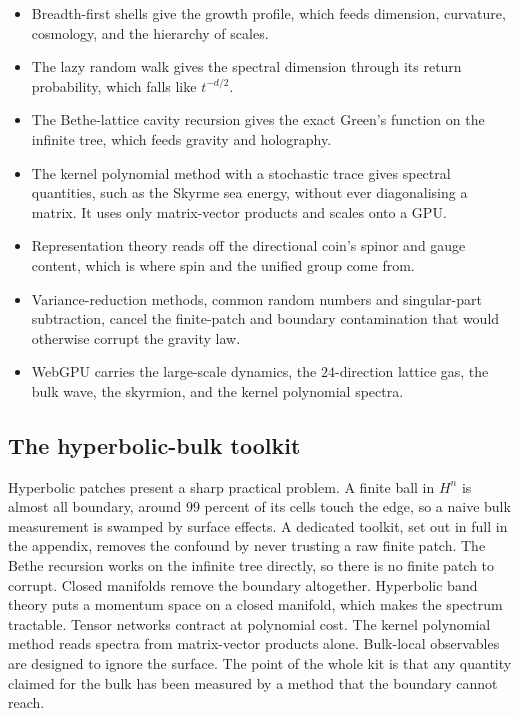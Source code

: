 \begin{itemize}
  \item Breadth-first shells give the growth profile, which feeds dimension, curvature, cosmology, and the
  hierarchy of scales.
  \item The lazy random walk gives the spectral dimension through its return probability, which falls like
  $t^{-d/2}$.
  \item The Bethe-lattice cavity recursion gives the exact Green's function on the infinite tree, which feeds
  gravity and holography.
  \item The kernel polynomial method with a stochastic trace gives spectral quantities, such as the Skyrme sea
  energy, without ever diagonalising a matrix. It uses only matrix-vector products and scales onto a GPU.
  \item Representation theory reads off the directional coin's spinor and gauge content, which is where spin and
  the unified group come from.
  \item Variance-reduction methods, common random numbers and singular-part subtraction, cancel the
  finite-patch and boundary contamination that would otherwise corrupt the gravity law.
  \item WebGPU carries the large-scale dynamics, the $24$-direction lattice gas, the bulk wave, the skyrmion,
  and the kernel polynomial spectra.
\end{itemize}

\subsection{The hyperbolic-bulk toolkit}

Hyperbolic patches present a sharp practical problem. A finite ball in $H^n$ is almost all boundary, around $99$
percent of its cells touch the edge, so a naive bulk measurement is swamped by surface effects. A dedicated
toolkit, set out in full in the appendix, removes the confound by never trusting a raw finite patch. The Bethe
recursion works on the infinite tree directly, so there is no finite patch to corrupt. Closed manifolds remove
the boundary altogether. Hyperbolic band theory puts a momentum space on a closed manifold, which makes the
spectrum tractable. Tensor networks contract at polynomial cost. The kernel polynomial method reads spectra from
matrix-vector products alone. Bulk-local observables are designed to ignore the surface. The point of the whole
kit is that any quantity claimed for the bulk has been measured by a method that the boundary cannot reach.

